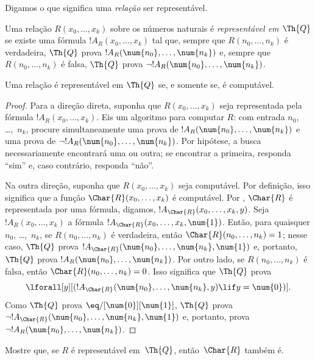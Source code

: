 \documentclass[../../../include/open-logic-section]{subfiles}
\begin{document}


Digamos o que significa uma \emph{relação} ser representável.

\begin{defn}
 Uma relação $R(x_0,\dots,x_k)$
sobre os números naturais é {\em representável em $\Th{Q}$} se existe
uma fórmula $!A_R(x_0,\dots,x_k)$ tal que, sempre que
$R(n_0,\dots,n_k)$ é verdadeira, $\Th{Q}$ prova
$!A_R(\num{n_0},\dots,\num{n_k})$ e, sempre que
$R(n_0,\dots,n_k)$ é falsa, $\Th{Q}$ prova $\lnot !A_R(\num{n_0},
\dots, \num{n_k})$.
\end{defn}

\begin{thm}
 Uma relação é representável em
$\Th{Q}$ se, e somente se, é computável.
\end{thm}

\begin{proof}
Para a direção direta, suponha que $R(x_0,\dots,x_k)$ seja
representada pela fórmula $!A_R(x_0,\dots,x_k)$. Eis um algoritmo para
computar $R$: com entrada $n_0$, \dots,~$n_k$, procure simultaneamente
uma prova de $!A_R(\num{n_0}, \dots, \num{n_k})$ e uma prova de
$\lnot !A_R(\num{n_0}, \dots, \num{n_k})$. Por hipótese, a busca
necessariamente encontrará uma ou outra; se encontrar a primeira,
responda ``sim'' e, caso contrário, responda ``não''.

Na outra direção, suponha que $R(x_0, \dots, x_k)$ seja computável.
Por definição, isso significa que a função $\Char{R}(x_0, \dots, x_k)$
é computável. Por , $\Char{R}$
é representada por uma fórmula, digamos,
$!A_{\Char{R}}(x_0, \dots, x_k, y)$. Seja $!A_R(x_0, \dots, x_k)$ a
fórmula $!A_{\Char{R}}(x_0, \dots, x_k, \num{1})$. Então, para
quaisquer $n_0$, \dots,~$n_k$, se $R(n_0, \dots, n_k)$ é verdadeira,
então $\Char{R}(n_0, \dots, n_k) = 1$; nesse caso, $\Th{Q}$ prova
$!A_{\Char{R}}(\num{n_0}, \dots, \num{n_k}, \num{1})$ e, portanto,
$\Th{Q}$ prova $!A_R(\num{n_0}, \dots, \num{n_k})$. Por outro lado,
se $R(n_0, \dots, n_k)$ é falsa, então
$\Char{R}(n_0, \dots, n_k) = 0$. Isso significa que $\Th{Q}$ prova
\[
\lforall[y][(!A_{\Char{R}}(\num{n_0}, \dots, \num{n_k}, y) \lif y =
  \num{0})].
\]
Como $\Th{Q}$ prova $\eq/[\num{0}][\num{1}]$, $\Th{Q}$ prova
$\lnot !A_{\Char{R}}(\num{n_0}, \dots, \num{n_k}, \num{1})$ e,
portanto, prova $\lnot !A_R(\num{n_0}, \dots, \num{n_k})$.
\end{proof}

\begin{prob}
Mostre que, se $R$ é representável em~$\Th{Q}$, então~$\Char{R}$
também é.
\end{prob}
\end{document}
